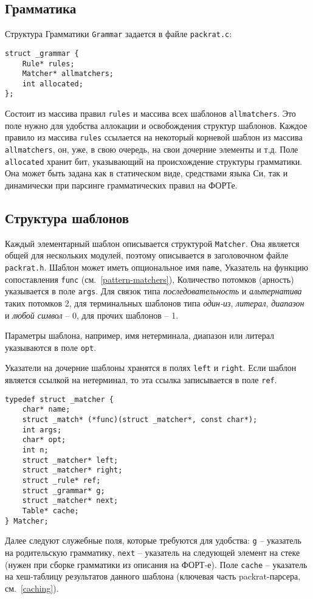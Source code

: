 \documentclass[10pt]{report}
\begin{document}
\subsection{Грамматика}
\label{sec:grammar}
Структура Грамматики \texttt{Grammar} задается в файле \texttt{packrat.c}:
\begin{lstlisting}[firstnumber=7]
struct _grammar {
	Rule* rules;
	Matcher* allmatchers;
	int allocated;
};
\end{lstlisting}
Состоит из массива правил \texttt{rules} и массива всех шаблонов \texttt{allmatchers}.
Это поле нужно для удобства аллокации и освобождения структур шаблонов.
Каждое правило из массива \texttt{rules} ссылается на некоторый корневой шаблон из массива \texttt{allmatchers}, он, уже, в свою очередь, на свои дочерние элементы и т.д. 
Поле \texttt{allocated} хранит бит, указывающий на происхождение структуры грамматики.
Она может быть задана как в статическом виде, средствами языка Си, так и динамически при парсинге  грамматических правил на ФОРТе.

\subsection{Структура шаблонов}
\label{sec:matchers}
Каждый элементарный шаблон описывается структурой \texttt{Matcher}. Она является общей для нескольких модулей, поэтому описывается в заголовочном файле \texttt{packrat.h}.
Шаблон может иметь опциональное имя \texttt{name}, Указатель на функцию сопоставления \texttt{func} (см.~\ref{pattern-matchers}),
Количество потомков (арность) указывается в поле \texttt{args}.
 Для связок типа {\em последовательность} и {\em альтернатива} таких потомков 2, 
для терминальных шаблонов типа {\em один-из}, {\em литерал}, {\em диапазон} и {\em любой символ} -- 0, 
для прочих шаблонов -- 1.

Параметры шаблона, например, имя нетерминала, диапазон или литерал  указываются в поле \texttt{opt}.

Указатели на дочерние шаблоны хранятся в полях \texttt{left} и \texttt{right}.
Если шаблон является ссылкой на нетерминал, то эта ссылка записывается в поле \texttt{ref}.
\begin{lstlisting}[firstnumber=6]
typedef struct _matcher {
	char* name;
	struct _match* (*func)(struct _matcher*, const char*);
	int args;
	char* opt;
	int n;
	struct _matcher* left;
	struct _matcher* right;
	struct _rule* ref;
	struct _grammar* g;
	struct _matcher* next;
	Table* cache;
} Matcher;
\end{lstlisting}
Далее следуют служебные поля, которые требуются для удобства: \texttt{g} -- указатель на родительскую грамматику, \texttt{next} -- указатель на следующей элемент на стеке (нужен при сборке грамматики из описания на ФОРТ-е).
Поле \texttt{cache} -- указатель на хеш-таблицу результатов данного шаблона (ключевая часть packrat-парсера, см.~\ref{caching}).
\end{document}
